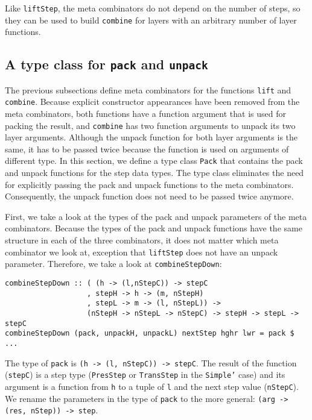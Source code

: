 Like \texttt{liftStep}, the meta combinators do not depend on the number of steps, so they can be used to build \texttt{combine} for layers with an arbitrary number of layer functions.


%																
\subsection{A type class for \texttt{pack} and \texttt{unpack}} \label{subsecttypeclass}

The previous subsections define meta combinators for the functions \texttt{lift} and \texttt{combine}. Because explicit constructor appearances have been removed from the meta combinators, both functions have a function argument that is used for packing the result, and \texttt{combine} has two function arguments to unpack its two layer arguments. Although the unpack function for both layer arguments is the same, it has to be passed twice because the function is used on arguments of different type. In this section, we define a type class \texttt{Pack} that contains the pack and unpack functions for the step data types. The type class eliminates the need for explicitly passing the pack and unpack functions to the meta combinators. Consequently, the unpack function does not need to be passed twice anymore. 

First, we take a look at the types of the pack and unpack parameters of the meta combinators. Because the types of the pack and unpack functions have the same structure in each of the three combinators, it does not matter which meta combinator we look at, exception that \texttt{liftStep} does not have an unpack parameter. Therefore, we take a look at \texttt{combineStepDown}:

\begin{small}
\begin{verbatim}
combineStepDown :: ( (h -> (l,nStepC)) -> stepC 
                   , stepH -> h -> (m, nStepH)
                   , stepL -> m -> (l, nStepL)) -> 
                   (nStepH -> nStepL -> nStepC) -> stepH -> stepL -> stepC
combineStepDown (pack, unpackH, unpackL) nextStep hghr lwr = pack $ ...

\end{verbatim}
\end{small}

The type of \texttt{pack} is \texttt{(h -> (l, nStepC)) -> stepC}. The result of the function (\texttt{stepC}) is a step type (\texttt{PresStep} or \texttt{TransStep} in the \texttt{Simple'} case) and its argument is a function from \texttt{h} to a tuple of \texttt{l} and the next step value (\texttt{nStepC}). We rename the parameters in the type of \texttt{pack} to the more general: \texttt{(arg -> (res, nStep)) -> step}.

